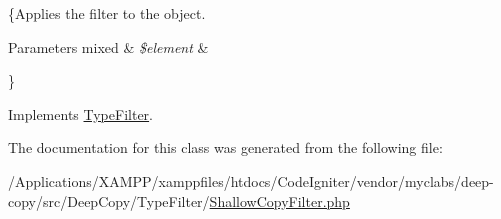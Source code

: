 \{Applies the filter to the object.


\begin{DoxyParams}[1]{Parameters}
mixed & {\em \$element} & \\
\hline
\end{DoxyParams}
\} 

Implements \mbox{\hyperlink{interface_deep_copy_1_1_type_filter_1_1_type_filter_a959e75f8f2b305dcf33633745c338176}{Type\+Filter}}.



The documentation for this class was generated from the following file\+:\begin{DoxyCompactItemize}
\item 
/\+Applications/\+X\+A\+M\+P\+P/xamppfiles/htdocs/\+Code\+Igniter/vendor/myclabs/deep-\/copy/src/\+Deep\+Copy/\+Type\+Filter/\mbox{\hyperlink{_shallow_copy_filter_8php}{Shallow\+Copy\+Filter.\+php}}\end{DoxyCompactItemize}
